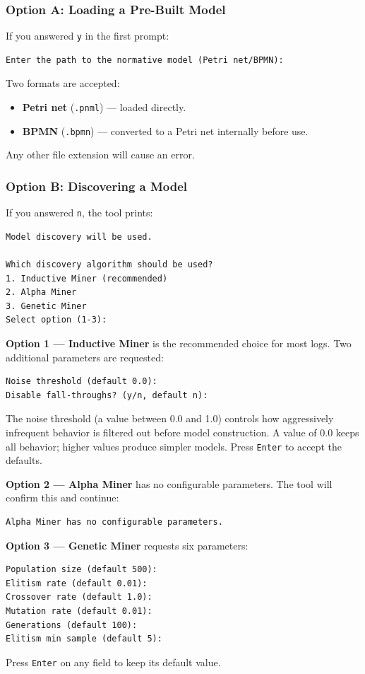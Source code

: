 \documentclass[12pt,a4paper]{article}
\begin{document}
\subsubsection{Option A: Loading a Pre-Built Model}
If you answered \texttt{y} in the first prompt:
\begin{verbatim}
Enter the path to the normative model (Petri net/BPMN):
\end{verbatim}
Two formats are accepted:
\begin{itemize}
    \item \textbf{Petri net} (\texttt{.pnml}) --- loaded directly.
    \item \textbf{BPMN} (\texttt{.bpmn}) --- converted to a Petri net internally before use.
\end{itemize}
Any other file extension will cause an error.

\subsubsection{Option B: Discovering a Model}
If you answered \texttt{n}, the tool prints:
\begin{verbatim}
Model discovery will be used.

Which discovery algorithm should be used?
1. Inductive Miner (recommended)
2. Alpha Miner
3. Genetic Miner
Select option (1-3):
\end{verbatim}

\textbf{Option 1 --- Inductive Miner} is the recommended choice for most logs. Two additional parameters are requested:
\begin{verbatim}
Noise threshold (default 0.0):
Disable fall-throughs? (y/n, default n):
\end{verbatim}
The noise threshold (a value between 0.0 and 1.0) controls how aggressively infrequent behavior is filtered out before model construction. A value of 0.0 keeps all behavior; higher values produce simpler models. Press \texttt{Enter} to accept the defaults.

\textbf{Option 2 --- Alpha Miner} has no configurable parameters. The tool will confirm this and continue:
\begin{verbatim}
Alpha Miner has no configurable parameters.
\end{verbatim}

\textbf{Option 3 --- Genetic Miner} requests six parameters:
\begin{verbatim}
Population size (default 500):
Elitism rate (default 0.01):
Crossover rate (default 1.0):
Mutation rate (default 0.01):
Generations (default 100):
Elitism min sample (default 5):
\end{verbatim}
Press \texttt{Enter} on any field to keep its default value.
\end{document}
